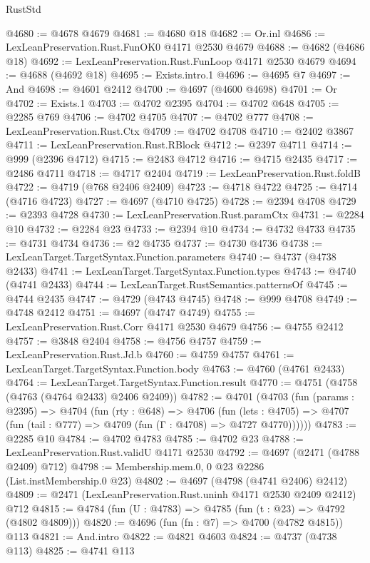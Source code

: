 \begin{lexlean}{RustStd}
\begin{coremodule}
@4680 := @4678 @4679
@4681 := @4680 @18
@4682 := Or.inl
@4686 := LexLeanPreservation.Rust.FunOK0 @4171 @2530 @4679
@4688 := @4682 (@4686 @18)
@4692 := LexLeanPreservation.Rust.FunLoop @4171 @2530 @4679
@4694 := @4688 (@4692 @18)
@4695 := Exists.intro.{1}
@4696 := @4695 @7
@4697 := And
@4698 := @4601 @2412
@4700 := @4697 (@4600 @4698)
@4701 := Or
@4702 := Exists.{1}
@4703 := @4702 @2395
@4704 := @4702 @648
@4705 := @2285 @769
@4706 := @4702 @4705
@4707 := @4702 @777
@4708 := LexLeanPreservation.Rust.Ctx
@4709 := @4702 @4708
@4710 := @2402 @3867
@4711 := LexLeanPreservation.Rust.RBlock
@4712 := @2397 @4711
@4714 := @999 (@2396 @4712)
@4715 := @2483 @4712
@4716 := @4715 @2435
@4717 := @2486 @4711
@4718 := @4717 @2404
@4719 := LexLeanPreservation.Rust.foldB
@4722 := @4719 (@768 @2406 @2409)
@4723 := @4718 @4722
@4725 := @4714 (@4716 @4723)
@4727 := @4697 (@4710 @4725)
@4728 := @2394 @4708
@4729 := @2393 @4728
@4730 := LexLeanPreservation.Rust.paramCtx
@4731 := @2284 @10
@4732 := @2284 @23
@4733 := @2394 @10
@4734 := @4732 @4733
@4735 := @4731 @4734
@4736 := @2 @4735
@4737 := @4730 @4736
@4738 := LexLeanTarget.TargetSyntax.Function.parameters
@4740 := @4737 (@4738 @2433)
@4741 := LexLeanTarget.TargetSyntax.Function.types
@4743 := @4740 (@4741 @2433)
@4744 := LexLeanTarget.RustSemantics.patternsOf
@4745 := @4744 @2435
@4747 := @4729 (@4743 @4745)
@4748 := @999 @4708
@4749 := @4748 @2412
@4751 := @4697 (@4747 @4749)
@4755 := LexLeanPreservation.Rust.Corr @4171 @2530 @4679
@4756 := @4755 @2412
@4757 := @3848 @2404
@4758 := @4756 @4757
@4759 := LexLeanPreservation.Rust.Jd.b
@4760 := @4759 @4757
@4761 := LexLeanTarget.TargetSyntax.Function.body
@4763 := @4760 (@4761 @2433)
@4764 := LexLeanTarget.TargetSyntax.Function.result
@4770 := @4751 (@4758 (@4763 (@4764 @2433) @2406 @2409))
@4782 := @4701
    (@4703
      (fun (params : @2395) =>
      @4704
        (fun (rty : @648) =>
        @4706
          (fun (lets : @4705) =>
          @4707 (fun (tail : @777) => @4709 (fun (Γ : @4708) => @4727 @4770))))))
@4783 := @2285 @10
@4784 := @4702 @4783
@4785 := @4702 @23
@4788 := LexLeanPreservation.Rust.validU @4171 @2530
@4792 := @4697 (@2471 (@4788 @2409) @712)
@4798 := Membership.mem.{0, 0} @23 @2286 (List.instMembership.{0} @23)
@4802 := @4697 (@4798 (@4741 @2406) @2412)
@4809 := @2471 (LexLeanPreservation.Rust.uninh @4171 @2530 @2409 @2412) @712
@4815 := @4784 (fun (U : @4783) => @4785 (fun (t : @23) => @4792 (@4802 @4809)))
@4820 := @4696 (fun (fn : @7) => @4700 (@4782 @4815)) @113
@4821 := And.intro
@4822 := @4821 @4603
@4824 := @4737 (@4738 @113)
@4825 := @4741 @113

\end{coremodule}
\end{lexlean}
